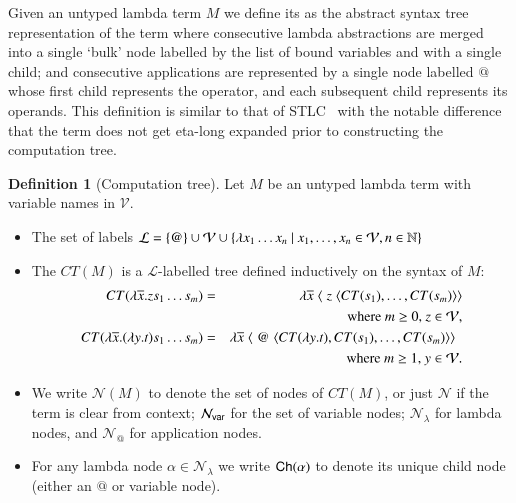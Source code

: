 \documentclass{elsarticle}
\makeatletter
\theoremstyle{plain}
\theoremstyle{definition}
\newtheorem{definition}{Definition}[section]
\theoremstyle{remark}
\newcommand\VarSet{\mathcal{V}}
\newcommand\Nodes{\mathcal{N}}%
\newcommand\NodesVar{\Nodes_{\sf var}}%
\newcommand\NodesLmd{\Nodes_\lambda}%
\newcommand\NodesApp{\Nodes_@}%
\newcommand{\child}{{\small \sf Ch}} %
\newcommand{\ctree}{CT} %
\makeatother
\begin{document}
Given an untyped lambda term $M$ we define its  as the abstract syntax tree representation of the term where consecutive lambda abstractions are merged into a single `bulk' node labelled by the list of bound variables and with a single child; and consecutive applications are represented by a single node labelled $@$ whose first child represents the operator, and each subsequent child represents its operands.
This definition is similar to that of STLC~\cite{Ong2006, BlumPhd} with the notable difference that the term does not get eta-long expanded prior to constructing the computation tree.
\begin{definition}[Computation tree]
Let $M$ be an untyped lambda term with variable names in $\VarSet$.
\begin{itemize}
\item The set of labels
$\mathcal{L} = \{ @ \} \union \VarSet \union \{ \lambda x_1 \ldots x_n \ | \ x_1 ,\ldots, x_n \in
    \VarSet, n\in\nat \}$
\item
    The  $\ctree(M)$ is a $\mathcal{L}$-labelled tree defined inductively on the syntax of $M$:
    \begin{eqnarray*}
        \ctree(\lambda \overline{x} . z s_1 \ldots s_m) &=& \lambda \overline{x}\; \langle\; z\; \langle \ctree(s_1),\ldots,\ctree(s_m)\rangle\rangle\\
        && \hbox {where $m\geq 0$, $z \in \VarSet$}, \\
 \ctree(\lambda \overline{x} . (\lambda y.t) s_1 \ldots s_m) &=& \lambda \overline{x}\; \langle\; @ \; \langle \ctree(\lambda y.t),\ctree(s_1),\ldots,\ctree(s_m) \rangle \rangle \enspace\\
&&  \hbox{where $m\geq 1$, $y\in \VarSet$}.
    \end{eqnarray*}

\item We write $\Nodes(M)$ to denote the set of nodes of $\ctree(M)$, or just $\Nodes$ if the term is clear from context; $\NodesVar$ for the set of variable nodes; $\NodesLmd$ for lambda nodes, and $\NodesApp$ for  application nodes.

\item For any lambda node $\alpha\in\NodesLmd$ we write $\child(\alpha)$ to denote its unique child node (either an $@$ or variable node).
\end{itemize}
\end{definition}
\end{document}
